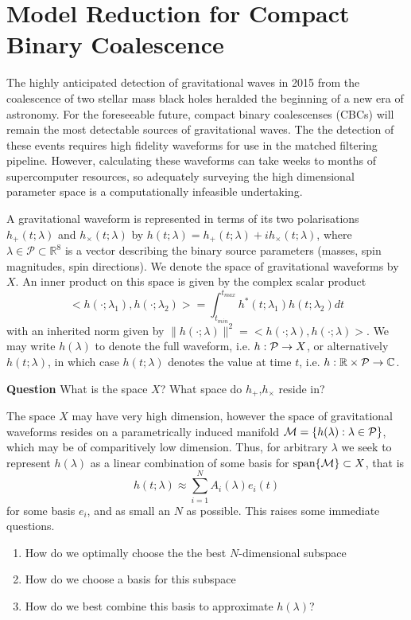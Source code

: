 


\chapter{Model Reduction for Compact Binary Coalescence}

The highly anticipated detection of gravitational waves in 2015 from the coalescence of two stellar mass black holes heralded the beginning of a new era of astronomy. For the foreseeable future, compact binary coalescenses (CBCs) will remain the most detectable sources of gravitational waves. The the detection of these events requires high fidelity waveforms for use in the matched filtering pipeline. However, calculating these waveforms can take weeks to months of supercomputer resources, so adequately surveying the high dimensional parameter space is a computationally infeasible undertaking.

A gravitational waveform is represented in terms of its two polarisations $h_+(t;\lambda)$ and $h_\times(t;\lambda)$ by $h(t;\lambda)=h_+(t;\lambda)+ih_\times(t;\lambda)$, where $\lambda \in \mathcal{P} \subset \mathbb{R}^8$ is a vector describing the binary source parameters (masses, spin magnitudes, spin directions). We denote the space of gravitational waveforms by $X$. An inner product on this space is given by the complex scalar product 
\begin{equation}
<h(\cdot; \lambda_1), h(\cdot; \lambda_2)> = \int^{t_{max}}_{t_{min}} h^*(t; \lambda_1) h(t;\lambda_2) dt
\end{equation}
with an inherited norm given by $\| h(\cdot;\lambda) \|^2 = <h(\cdot; \lambda), h(\cdot; \lambda)>$. We may write $h(\lambda)$ to denote the full waveform, i.e. $h:\mathcal{P} \rightarrow X$, or alternatively $h(t;\lambda)$, in which case $h(t;\lambda)$ denotes the value at time $t$, i.e. $h: \mathbb{R} \times \mathcal{P} \rightarrow \mathbb{C}$. 

\textbf{Question} What is the space $X$? What space do $h_+$,$h_\times$ reside in?

The space $X$ may have very high dimension, however the space of gravitational waveforms resides on a parametrically induced manifold $\mathcal{M}=\{ h(\lambda) : \lambda \in \mathcal{P}\}$, which may be of comparitively low dimension. Thus, for arbitrary $\lambda$ we seek to represent $h(\lambda)$ as a linear combination of some basis for $\mbox{span}\{\mathcal{M} \}\subset X$, that is 
\begin{equation}
h(t;\lambda) \approx \sum_{i=1}^N A_i (\lambda) e_i(t)
\end{equation}
for some basis $e_i$, and as small an $N$ as possible. This raises some immediate questions.
\begin{enumerate}
\item How do we optimally choose the the best $N$-dimensional subspace
\item How do we choose a basis for this subspace
\item How do we best combine this basis to approximate $h(\lambda)$? 
\end{enumerate}

